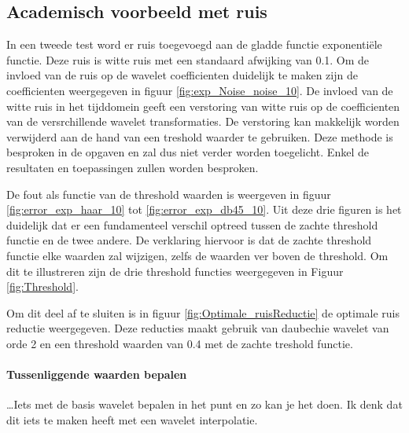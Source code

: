 \subsection{Academisch voorbeeld met ruis}

In een tweede test word er ruis toegevoegd aan de gladde functie exponenti\"ele functie.
Deze ruis is witte ruis met een standaard afwijking van 0.1.
Om de invloed van de ruis op de wavelet coefficienten duidelijk te maken zijn de coefficienten weergegeven in 
figuur \ref{fig:exp_Noise_noise_10}.
De invloed van de witte ruis in het tijddomein geeft  een verstoring van witte ruis op de coefficienten van de versrchillende wavelet transformaties.
De verstoring kan makkelijk worden verwijderd aan de hand van een treshold waarder te gebruiken.
Deze methode is besproken in de opgaven en zal dus niet verder worden toegelicht.
Enkel de resultaten en toepassingen zullen worden besproken.

De fout als functie van de threshold waarden is weergeven in figuur \ref{fig:error_exp_haar_10} tot \ref{fig:error_exp_db45_10}.
Uit deze drie figuren is het duidelijk dat er een fundamenteel verschil optreed tussen de zachte threshold functie en de twee andere.
De verklaring hiervoor is dat de zachte threshold functie elke waarden zal wijzigen, zelfs de waarden ver boven de threshold.
Om dit te illustreren zijn de drie threshold functies weergegeven in Figuur \ref{fig:Threshold}.

Om dit deel af te sluiten is in figuur \ref{fig:Optimale_ruisReductie} de optimale ruis reductie weergegeven.
Deze reducties maakt gebruik van daubechie wavelet van orde 2 en een threshold waarden van 0.4 met  de zachte treshold functie.


\paragraph{Tussenliggende waarden bepalen}

\dots Iets met de basis wavelet bepalen in het punt  en zo kan je het doen. Ik denk dat dit iets te maken heeft met een wavelet interpolatie.


